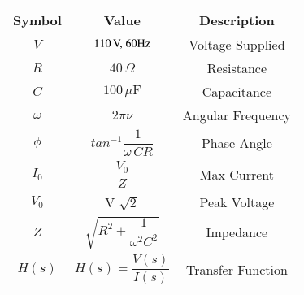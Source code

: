 \begin{tabular}{|c|c|c|}
	\hline
	\textbf{Symbol} & \textbf{Value} & \textbf{Description}\\[6pt]
	\hline
	$V$ & $110\,\text{V,\;60Hz}$  & Voltage Supplied\\[2pt]
	\hline
	$R$ & $40\, \Omega $ & Resistance\\[2pt]
	\hline
	$C$ & $100\, \mu\text{F}$ & Capacitance\\[2pt]
	\hline
	$\omega$ & $2\pi \nu $ & Angular Frequency\\[2pt]
	\hline
	$\phi$ & $tan^{-1}\dfrac{1}{\omega\, CR}$ & Phase Angle\\[4pt]
	\hline
	$I_0$ & $\dfrac{V_0}{Z}$ & Max Current\\[2pt]
	\hline
	$V_0$ & V $\sqrt{2}$ & Peak Voltage\\
	\hline
	$Z$ & $\sqrt {R^2 + \dfrac{1}{\omega^2C^2}}$ & Impedance \\[4pt]
	\hline
	$H(s)$ & $H(s)=\dfrac{V(s)}{I(s)}$  & Transfer Function\\[4pt]
	\hline
\end{tabular}
